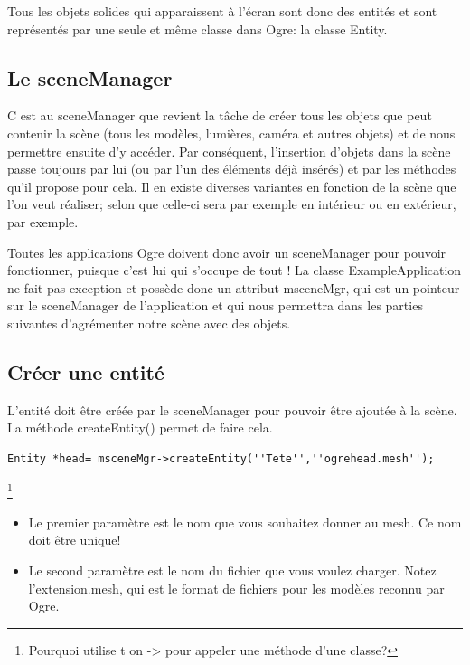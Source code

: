 \documentclass[10pt,a4paper]{report}
\begin{document}
Tous les objets solides qui apparaissent \`{a} l'\'ecran sont donc des entit\'es et sont repr\'esent\'es par une seule et m\^eme classe dans Ogre: la classe Entity.

\subsection{Le sceneManager}
C est au sceneManager que revient la t\^{a}che de cr\'eer tous les objets que peut contenir la sc\`ene (tous les mod\`eles, lumi\`eres, cam\'era et autres objets) et de nous permettre ensuite d'y acc\'eder.\newline
Par cons\'equent, l'insertion d'objets dans la sc\`ene passe toujours par lui (ou par l'un des \'el\'ements d\'ej\`{a} ins\'er\'es) et par les m\'ethodes qu'il propose pour cela.
Il en existe diverses variantes en fonction de la sc\`ene que l'on veut r\'ealiser; selon que celle-ci sera par exemple en int\'erieur ou en ext\'erieur, par exemple.

Toutes les applications Ogre doivent donc avoir un sceneManager pour pouvoir fonctionner, puisque c'est lui qui s'occupe de tout ! La classe ExampleApplication ne fait pas exception et poss\`ede donc un attribut msceneMgr, qui est un pointeur sur le sceneManager de l'application et qui nous permettra dans les parties suivantes d'agr\'ementer notre sc\`ene avec des objets.






\subsection{Cr\'eer une entit\'e}

L'entit\'e doit \^etre cr\'e\'ee par le sceneManager pour pouvoir \^etre ajout\'ee \`{a} la sc\`ene. La m\'ethode createEntity() permet de faire cela.
\begin{lstlisting}
Entity *head= msceneMgr->createEntity(''Tete'',''ogrehead.mesh'');
\end{lstlisting}\footnote{Pourquoi utilise t on -> pour appeler une m\'ethode d'une classe?}

\begin{itemize}
\item Le premier param\`etre est le nom que vous souhaitez donner au mesh. Ce nom doit \^etre unique!
\item Le second param\`etre est le nom du fichier que vous voulez charger. Notez l'extension.mesh, qui est le format de fichiers pour les mod\`eles reconnu par Ogre.
\end{itemize}
\end{document}
